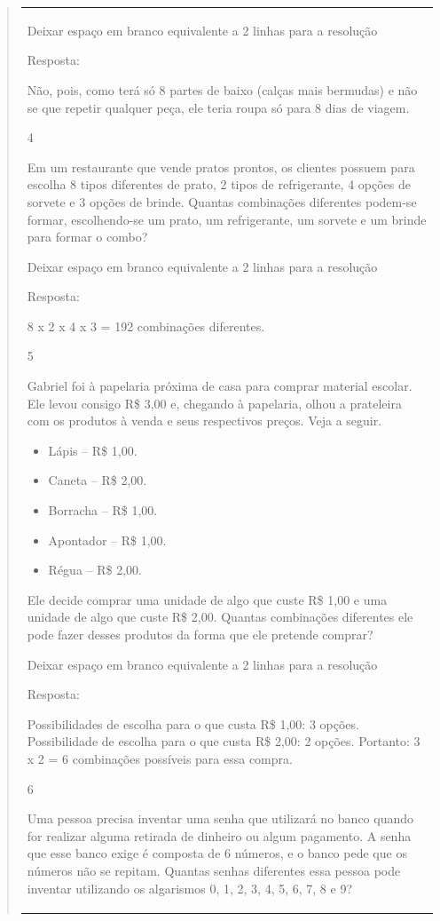\begin{mdframed}[linewidth=2pt,linecolor=salmao,roundcorner=2pt]
\begin{itemize}
{\begin{itemize}
\begin{escolha}
{\begin{quote}
{\begin{escolha}
{{{{{\begin{longtable}[]{@{}l@{}}
\begin{itemize}
{Deixar espaço em branco equivalente a 2 linhas para a resolução

Resposta:

Não, pois, como terá só 8 partes de baixo (calças mais bermudas) e não se
que repetir qualquer peça, ele teria roupa só para 8 dias de viagem.

\num{4}

Em um restaurante que vende pratos prontos, os clientes possuem para
escolha 8 tipos diferentes de prato, 2 tipos de refrigerante, 4 opções
de sorvete e 3 opções de brinde. Quantas combinações diferentes podem-se
formar, escolhendo-se um prato, um refrigerante, um sorvete e um brinde para
formar o combo?

Deixar espaço em branco equivalente a 2 linhas para a resolução

Resposta:

8 x 2 x 4 x 3 = 192 combinações diferentes.

\num{5}

Gabriel foi à papelaria próxima de casa para comprar material
escolar. Ele levou consigo R\$ 3,00 e, chegando à papelaria, olhou a
prateleira com os produtos à venda e seus respectivos preços. Veja a seguir.

\begin{itemize}
  \item Lápis -- R\$ 1,00.
  \item Caneta -- R\$ 2,00.
  \item Borracha -- R\$ 1,00.
  \item Apontador -- R\$ 1,00.
  \item Régua -- R\$ 2,00.
\end{itemize}

Ele decide comprar uma unidade de algo que custe R\$ 1,00 e uma unidade de
algo que custe R\$ 2,00. Quantas combinações diferentes ele pode fazer
desses produtos da forma que ele pretende comprar?

Deixar espaço em branco equivalente a 2 linhas para a resolução

Resposta:

Possibilidades de escolha para o que custa R\$ 1,00: 3 opções.
Possibilidade de escolha para o que custa R\$ 2,00: 2 opções.
Portanto: 3 x 2 = 6 combinações possíveis para essa compra.

\num{6}

Uma pessoa precisa inventar uma senha que utilizará no banco quando for
realizar alguma retirada de dinheiro ou algum pagamento. A senha que esse
banco exige é composta de 6 números, e o banco pede que os números
não se repitam. Quantas senhas diferentes essa pessoa pode inventar
utilizando os algarismos 0, 1, 2, 3, 4, 5, 6, 7, 8 e 9?

}
\end{itemize}
\end{longtable}}}}}}
\end{escolha}}
\end{quote}}
\end{escolha}
\end{itemize}}
\end{itemize}
\end{mdframed}
